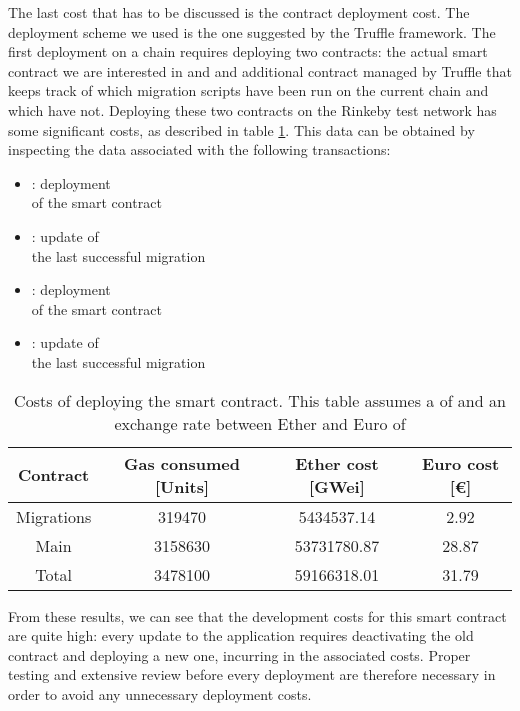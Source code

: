 The last cost that has to be discussed is the contract deployment cost. The deployment scheme we used is the one suggested by the Truffle framework. The first deployment on a chain requires deploying two contracts: the actual smart contract we are interested in and and additional  contract managed by Truffle that keeps track of which migration scripts have been run on the current chain and which have not. Deploying these two contracts on the Rinkeby test network has some significant costs, as described in table \ref{table:deployment-costs}. This data can be obtained by inspecting the data associated with the following transactions:

\begin{itemize}
    \item \txmigrationsdepoly: deployment \\ of the  smart contract
    \item \txupdatemiga: update of \\ the last successful migration
    \item \txmaindeploy: deployment \\ of the  smart contract
    \item \txupdatemigb: update of \\ the last successful migration
\end{itemize}

\begin{table}[tp]
    \caption[Cost of deploying the smart contract]{Costs of deploying the smart contract. This table assumes a  of \gaspricegwei and an exchange rate between Ether and Euro of \ethtoeur}
    \centering
    \label{table:deployment-costs}
    \begin{tabular}{c c c c}
        \toprule
        Contract & Gas consumed [Units] & Ether cost [GWei] & Euro cost [€]\\ 
        \midrule
        Migrations & 319470 & 5434537.14 & 2.92 \\ Main & 3158630 & 53731780.87 & 28.87 \\ Total & 3478100 & 59166318.01 & 31.79 \\
        \bottomrule
    \end{tabular}
\end{table}

From these results, we can see that the development costs for this smart contract are quite high: every update to the application requires deactivating the old contract and deploying a new one, incurring in the associated costs. Proper testing and extensive review before every deployment are therefore necessary in order to avoid any unnecessary deployment costs.

